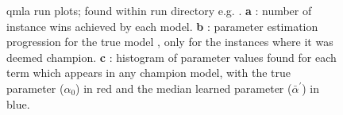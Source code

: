 \begin{figure}[H]
    \begin{center}
        \qquad
        \qquad
    \end{center}
    \caption[Run plots]{
        \gls{qmla} \gls{run} plots; found within \gls{run} directory e.g. . 
        \textbf{a} : number of \gls{instance} wins achieved by each model. 
        \textbf{b} : 
            parameter estimation progression for the  \gls{true model} , only for the \glspl{instance} where it was deemed champion. 
        \textbf{c} : 
            histogram of parameter values found for each term which appears in any \gls{champion model},
            with the true parameter ($\alpha_0$) in red and the median learned parameter ($\bar{\alpha}^{\prime}$) in blue.
    }
    \label{fig:run_plots}
\end{figure}

